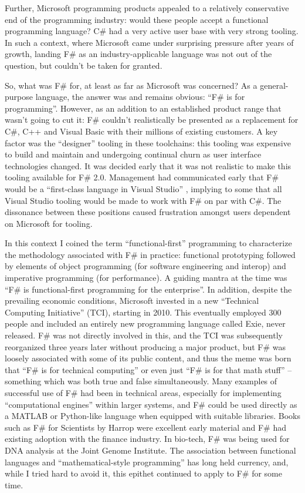 \documentclass[acmsmall,review]{acmart}\settopmatter{printfolios=true,printccs=false,printacmref=false}
\begin{document}
Further, Microsoft programming products appealed to a relatively conservative end of the programming industry: would these people accept a functional programming language? C\# had a very active user base with very strong tooling. In such a context, where Microsoft came under surprising pressure after years of growth, landing F\# as an industry-applicable language was not out of the question, but couldn’t be taken for granted.

So, what was F\# for, at least as far as Microsoft was concerned?  As a general-purpose language, the answer was and remains obvious: “F\# is for programming”.  However, as an addition to an established product range that wasn’t going to cut it: F\# couldn’t realistically be presented as a replacement for C\#, C++ and Visual Basic with their millions of existing customers. A key factor was the “designer” tooling in these toolchains: this tooling was expensive to build and maintain and undergoing continual churn as user interface technologies changed. It was decided early that it was not realistic to make this tooling available for F\# 2.0.   Management had communicated early that F\# would be a “first-class language in Visual Studio” , implying to some that all Visual Studio tooling would be made to work with F\# on par with C\#. The dissonance between these positions caused frustration amongst users dependent on Microsoft for tooling.  

In this context I coined the term “functional-first” programming to characterize the methodology associated with F\# in practice: functional prototyping followed by elements of object programming (for software engineering and interop) and imperative programming (for performance). A guiding mantra at the time was “F\# is functional-first programming for the enterprise”.  In addition, despite the prevailing economic conditions, Microsoft invested in a new “Technical Computing Initiative” (TCI), starting in 2010. This eventually employed 300 people and included an entirely new programming language called Exie, never released.  F\# was not directly involved in this, and the TCI was subsequently reorganized three years later without producing a major product, but F\# was loosely associated with some of its public content, and thus the meme was born that “F\# is for technical computing” or even just “F\# is for that math stuff” – something which was both true and false simultaneously. Many examples of successful use of F\# had been in technical areas, especially for implementing “computational engines” within larger systems, and F\# could be used directly as a MATLAB or Python-like language when equipped with suitable libraries.  Books such as F\# for Scientists by Harrop were excellent early material and F\# had existing adoption with the finance industry. In bio-tech, F\# was being used for DNA analysis at the Joint Genome Institute.  The association between functional languages and “mathematical-style programming” has long held currency, and, while I tried hard to avoid it, this epithet continued to apply to F\# for some time.  
\end{document}
